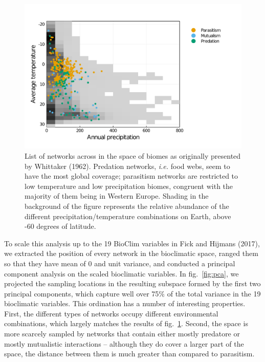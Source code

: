 \documentclass[10pt,oneside]{article}
\makeatletter
\def\maxwidth{\ifdim\Gin@nat@width>\linewidth\linewidth
\else\Gin@nat@width\fi}
\let\Oldincludegraphics\includegraphics
\renewcommand{\includegraphics}[1]{\Oldincludegraphics[width=\maxwidth]{#1}}
\makeatother
\begin{document}
\begin{figure}
\hypertarget{fig:biomes}{%
\centering
\includegraphics{figures/networks_by_biomes.png}
\caption{List of networks across in the space of biomes as originally
presented by Whittaker (1962). Predation networks, \emph{i.e.} food
webs, seem to have the most global coverage; parasitism networks are
restricted to low temperature and low precipitation biomes, congruent
with the majority of them being in Western Europe. Shading in the
background of the figure represents the relative abundance of the
different precipitation/temperature combinations on Earth, above -60
degrees of latitude.}\label{fig:biomes}
}
\end{figure}

To scale this analysis up to the 19 BioClim variables in Fick and
Hijmans (2017), we extracted the position of every network in the
bioclimatic space, ranged them so that they have mean of 0 and unit
variance, and conducted a principal component analysis on the scaled
bioclimatic variables. In fig.~\ref{fig:pca}, we projected the sampling
locations in the resulting subspace formed by the first two principal
components, which capture well over 75\% of the total variance in the 19
bioclimatic variables. This ordination has a number of interesting
properties. First, the different types of networks occupy different
environmental combinations, which largely matches the results of
fig.~\ref{fig:biomes}. Second, the space is more scarcely sampled by
networks that contain either mostly predatore or mostly mutualistic
interactions -- although they do cover a larger part of the space, the
distance between them is much greater than compared to parasitism.
\end{document}
